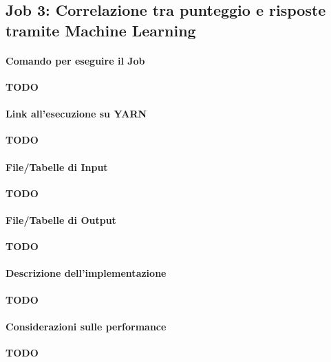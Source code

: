 

\subsection[%
    Job 3: Correlazione tra punteggio e risposte tramite Machine Learning%
  ]{%
    Job 3: Correlazione tra punteggio e risposte tramite Machine Learning%
  }\label{subsec:job3}

  \paragraph{Comando per eseguire il Job}\label{par:job3:cmd}

  \textbf{TODO}

  \paragraph{Link all'esecuzione su YARN}\label{par:job3:yarn}

  \textbf{TODO}

  \paragraph{File/Tabelle di Input}\label{par:job3:input}

  \textbf{TODO}

  \paragraph{File/Tabelle di Output}\label{par:job3:output}

  \textbf{TODO}

  \paragraph{Descrizione dell'implementazione}\label{par:job3:implementation}

  \textbf{TODO}

  \paragraph{Considerazioni sulle performance}\label{par:job3:performance}

  \textbf{TODO}
